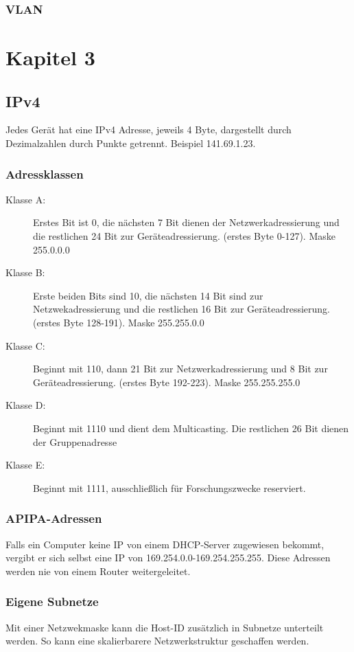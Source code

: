 \documentclass[a4paper,10pt]{scrartcl}
\begin{document}
        \subsubsection{VLAN}
        \newpage
\section{Kapitel 3}
    \subsection{IPv4}
    Jedes Gerät hat eine IPv4 Adresse, jeweils 4 Byte, dargestellt durch Dezimalzahlen durch Punkte getrennt. Beispiel 141.69.1.23. 
    \subsubsection{Adressklassen}
    \begin{description}
        \item[Klasse A:] Erstes Bit ist 0, die nächsten 7 Bit dienen der Netzwerkadressierung und die restlichen 24 Bit zur Geräteadressierung. (erstes Byte 0-127). Maske 255.0.0.0
        \item[Klasse B:] Erste beiden Bits sind 10, die nächsten 14 Bit sind zur Netzwekadressierung und die restlichen 16 Bit zur Geräteadressierung. (erstes Byte 128-191). Maske 255.255.0.0
        \item[Klasse C:] Beginnt mit 110, dann 21 Bit zur Netzwerkadressierung und 8 Bit zur Geräteadressierung. (erstes Byte 192-223). Maske 255.255.255.0
        \item[Klasse D:] Beginnt mit 1110 und dient dem Multicasting. Die restlichen 26 Bit dienen der Gruppenadresse
        \item[Klasse E:] Beginnt mit 1111, ausschließlich für Forschungszwecke reserviert.
    \end{description}
    \subsubsection{APIPA-Adressen}
        Falls ein Computer keine IP von einem DHCP-Server zugewiesen bekommt, vergibt er sich selbst eine IP von 169.254.0.0-169.254.255.255. Diese Adressen werden nie von einem Router weitergeleitet.
    \subsubsection{Eigene Subnetze}
        Mit einer Netzwekmaske kann die Host-ID zusätzlich in Subnetze unterteilt werden. So kann eine skalierbarere Netzwerkstruktur geschaffen werden.
\end{document}
